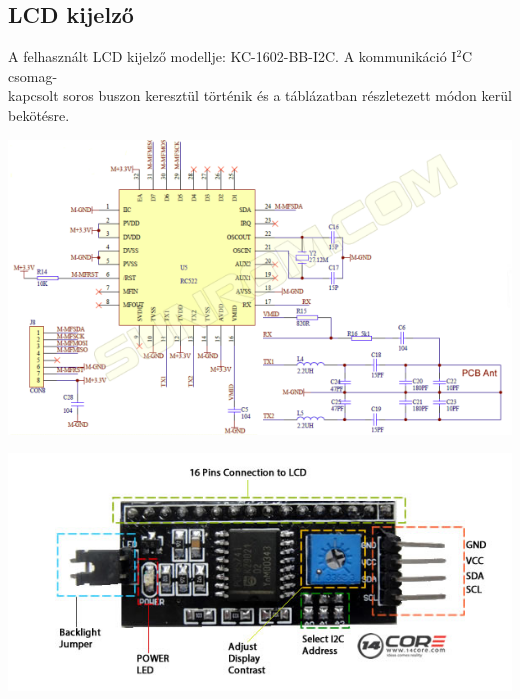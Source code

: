 \documentclass[11pt, a4paper]{article}
\begin{document}
		\subsection{LCD kijelző}
		\begin{flushleft}
			\justifying
			A felhasznált LCD kijelző modellje: KC-1602-BB-I2C. A kommunikáció I$^2$C csomag-\\kapcsolt soros buszon keresztül történik és a táblázatban részletezett módon kerül bekötésre.
		\end{flushleft}
		\begin{minipage}{\linewidth}
			\centering
			\includegraphics[width=1.0\linewidth]{img/rc552_shematic}
			\label{fig:4lcdshematic}
		\end{minipage}
		\begin{minipage}{\linewidth}
			\centering
			\includegraphics[width=1.0\linewidth]{img/i2c_pinout}
			\label{fig:5lcdpinout}
		\end{minipage}
\end{document}
